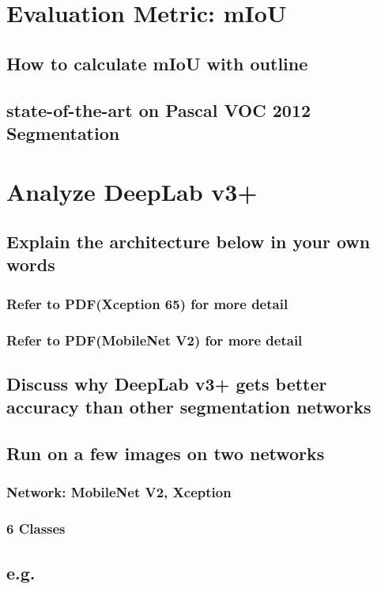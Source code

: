 \documentclass{article}
\begin{document}
\section{Evaluation Metric: mIoU}
\subsection{How to calculate mIoU with outline}
\subsection{state-of-the-art on Pascal VOC 2012 Segmentation}
\section{Analyze DeepLab v3+}
\subsection{Explain the architecture below in your own words}
\subsubsection{Refer to PDF(Xception 65) for more detail}
\subsubsection{Refer to PDF(MobileNet V2) for more detail}
\subsection{Discuss why DeepLab v3+ gets better accuracy than other segmentation networks}
\subsection{Run on a few images on two networks}
\subsubsection{Network: MobileNet V2, Xception}
\subsubsection{6 Classes}
\subsection{e.g.}
\end{document}

